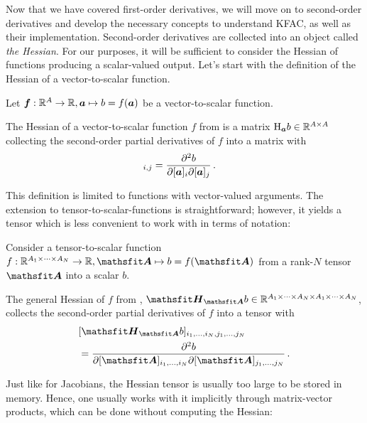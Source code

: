 Now that we have covered first-order derivatives, we will move on to second-order derivatives and develop the necessary concepts to understand KFAC, as well as their implementation.
Second-order derivatives are collected into an object called \emph{the Hessian}.
For our purposes, it will be sufficient to consider the Hessian of functions producing a scalar-valued output.
Let's start with the definition of the Hessian of a vector-to-scalar function.

\begin{setup}\label{setup:vector_to_scalar_function}
  Let ${\bm{f}}: {\mathbb{R}}^A \to {\mathbb{R}}, {\bm{a}} \mapsto b = f({\bm{a}})$ be a vector-to-scalar function.
\end{setup}

\begin{definition}\label{def:vector_hessian}
  The Hessian of a vector-to-scalar function $f$ from  is a matrix $\mathrm{H}_{{\bm{a}}}b \in {\mathbb{R}}^{A \times A}$ collecting the second-order partial derivatives of $f$ into a matrix with
  \begin{align*}
    [\hess_{\va}b]_{i,j}
    &=
      \frac{\partial^2 b}{\partial [\va]_i \partial [\va]_j}\,.
  \end{align*}
\end{definition}
This definition is limited to functions with vector-valued arguments. The extension to tensor-to-scalar-functions is straightforward; however, it yields a tensor which is less convenient to work with in terms of notation:

\begin{setup}\label{setup:hessians}
  Consider a tensor-to-scalar function $f: \sR^{A_1 \times \dots \times A_N} \to \sR, \tA \mapsto b = f(\tA)$ from a rank-$N$ tensor $\tA$ into a scalar $b$.
\end{setup}

\begin{definition}\label{def:general_hessian}
  The general Hessian of $f$ from , $\tH_{\tA}b \in \sR^{A_1 \times \dots \times A_N \times A_1 \times \dots \times A_N}$, collects the second-order partial derivatives of $f$ into a tensor with
  \begin{align*}
    &[\tH_{\tA}b]_{i_1, \dots, i_N, j_1, \dots, j_N}
      \\
    &=
      \frac{\partial^2 b}{\partial [\tA]_{i_1, \dots, i_N} \partial [\tA]_{j_1, \dots, j_N}}\,.
  \end{align*}
\end{definition}
Just like for Jacobians, the Hessian tensor is usually too large to be stored in memory.
Hence, one usually works with it implicitly through matrix-vector products, which can be done without computing the Hessian:

